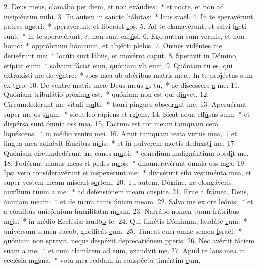 2. Deus meus, clamábo per diem, et non ex\uline{áu}dies:~* et nocte, et non ad insipiéntim m\uline{i}hi.
3. Tu autem in sancto h\uline{á}bitas:~* laus sr\uline{a}ël.
4. In te speravérunt patres n\uline{o}stri:~* speravérunt, et liberást \uline{e}os.
5. Ad te clamavérunt, et salvi f\uline{a}cti sunt:~* in te speravérunt, et non sunt cnf\uline{ú}si.
6. Ego autem sum vermis, et non h\uline{o}mo:~* oppróbrium hóminum, et abjécti pl\uline{e}bis.
7. Omnes vidéntes me deris\uline{é}runt me:~* locúti sunt lábiis, et movérnt c\uline{a}put.
8. Sperávit in Dómino, erípiat \uline{e}um:~* salvum fáciat eum, quóniam vlt \uline{e}um.
9. Quóniam tu es, qui extraxísti me de v\uline{e}ntre:~* spes mea ab ubéribus matris meæ. In te projéctus sum ex t\uline{e}ro.
10. De ventre matris meæ Deus meus \uline{e}s tu,~* ne discéssers \uline{a} me:
11. Quóniam tribulátio próxim\uline{a} est:~* quóniam non est qui dj\uline{u}vet.
12. Circumdedérunt me vítuli m\uline{u}lti:~* tauri pingues obsedr\uline{u}nt me.
13. Aperuérunt super me os s\uline{u}um:~* sicut leo rápiens et rg\uline{i}ens.
14. Sicut aqua eff\uline{ú}sus sum:~* et dispérsa sunt ómnia oss m\uline{e}a.
15. Factum est cor meum tamquam cera li\uline{qué}scens:~* in médio ventrs m\uline{e}i.
16. Aruit tamquam testa virtus mea,~† et lingua mea adhǽsit fáucibus m\uline{e}is:~* et in púlverem mortis deduxst\uline{i} me.
17. Quóniam circumdedérunt me canes m\uline{u}lti:~* concílium malignántium obsd\uline{i}t me.
18. Fodérunt manus meas et pedes m\uline{e}os:~* dinumeravérunt ómnia oss m\uline{e}a.
19. Ipsi vero consíderavérunt et inspex\uline{é}runt me:~* divisérunt sibi vestiménta mea, et super vestem meam misérnt s\uline{o}rtem.
20. Tu autem, Dómine, ne elongáveris auxílium tuum \uline{a} me:~* ad defensiónem meam cnsp\uline{i}ce.
21. Erue a frámea, Deus, ánimam m\uline{e}am:~* et de manu canis únicm m\uline{e}am.
22. Salva me ex ore le\uline{ó}nis:~* et a córnibus unicórnium humilitátm m\uline{e}am.
23. Narrábo nomen tuum frátribus m\uline{e}is:~* in médio Ecclésiæ laudb\uline{o} te.
24. Qui timétis Dóminum, laudáte \uline{e}um:~* univérsum semen Jacob, glorificát \uline{e}um.
25. Tímeat eum omne semen \uline{I}sraël:~* quóniam non sprevit, neque despéxit deprecatiónem pp\uline{e}ris:
26. Nec avértit fáciem suam \uline{a} me:~* et cum clamárem ad eum, exaudv\uline{i}t me.
27. Apud te laus mea in ecclésia m\uline{a}gna:~* vota mea reddam in conspéctu timéntim \uline{e}um.

